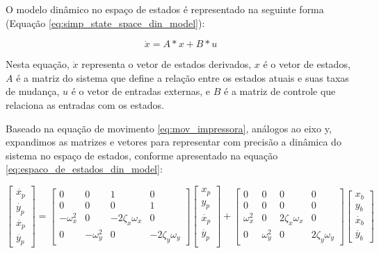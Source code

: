 O modelo dinâmico no espaço de estados é representado na seguinte forma (Equação \ref{eq:simp_state_space_din_model}):

\begin{equation}
    \label{eq:simp_state_space_din_model}
    \dot x = A*x+B*u
\end{equation}

Nesta equação, \(\dot x\) representa o vetor de estados derivados, \(x\) é o vetor de estados, \(A\) é a matriz do sistema que define a relação entre os estados atuais e suas taxas de mudança, \(u\) é o vetor de entradas externas, e \(B\) é a matriz de controle que relaciona as entradas com os estados.

Baseado na equação de movimento \ref{eq:mov_impressora}, análogos ao eixo y, expandimos as matrizes e vetores para representar com precisão a dinâmica do sistema no espaço de estados, conforme apresentado na equação \ref{eq:espaco_de_estados_din_model}:

\begin{equation}
    \label{eq:espaco_de_estados_din_model}
    \begin{bmatrix}
        \dot{x_p} \\
        \dot{y_p} \\
        \ddot{x_p} \\
        \ddot{y_p}
    \end{bmatrix}
    =
    \begin{bmatrix}
        0 & 0 & 1 & 0 \\
        0 & 0 & 0 & 1 \\
        -\omega _x ^2 & 0 & -2 \zeta _x \omega _x & 0 \\
        0 & -\omega _y ^2 & 0 & -2 \zeta _y \omega _y
    \end{bmatrix}
    \begin{bmatrix}
        x_p \\    
        y_p \\
        \dot{x_p} \\    
        \dot{y_p} \\
    \end{bmatrix}
    +
    \begin{bmatrix}
        0 & 0 & 0 & 0 \\
        0 & 0 & 0 & 0 \\
        \omega _x ^2 & 0 & 2 \zeta _x \omega _x & 0 \\
        0 & \omega _y ^2 & 0 & 2 \zeta _y \omega _y
    \end{bmatrix}
    \begin{bmatrix}
        x_b \\
        y_b \\
        \dot{x_b}  \\
        \dot{y_b} 
    \end{bmatrix}
\end{equation}

